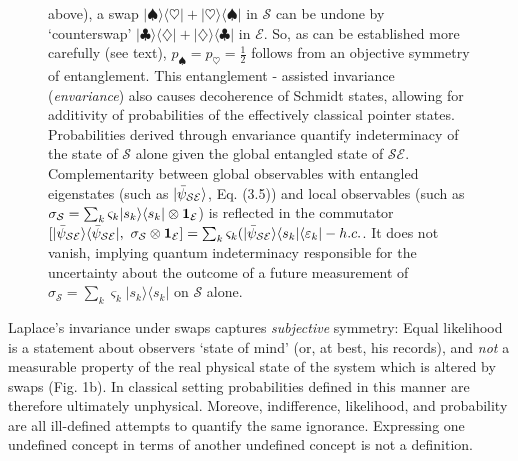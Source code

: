 \documentclass[aps,rmp,epsfig,11pt]{revtex4}
\newcommand{\bra}[1]    {\langle #1|}
\newcommand{\ket}[1]    {| #1 \rangle}
\newcommand{\cS}        {{\mathcal S}}
\newcommand{\cE}        {{\mathcal E}}
\newcommand{\+}         {\dagger}
\begin{document}
\begin{figure}[htb]
{above), a swap $\ket \spadesuit \bra \heartsuit + \ket \heartsuit \bra \spadesuit$ in $\cS$ can be undone by `counterswap' $\ket \clubsuit \bra \diamondsuit + \ket \diamondsuit \bra \clubsuit$ in $\cE$. So, 
as can be established more carefully (see text),  $p_\spadesuit = p_\heartsuit=\frac 1 2$ follows from 
an objective symmetry of entanglement. This entanglement - assisted invariance ({\it envariance}) 
also causes decoherence of Schmidt states, allowing for additivity of probabilities of the effectively classical pointer states. Probabilities derived through envariance quantify indeterminacy of the state of 
$\cS$ alone given the global entangled state of $\cS\cE$. Complementarity between 
global observables with entangled eigenstates (such as $\ket {\bar \psi_{\cal SE}}$, Eq. (3.5)) and 
local observables (such as $\sigma_{\cS} = \sum_k \varsigma_k |s_k \rangle \langle s_k|\otimes {\bf 1}_{\cE}$) is reflected in the commutator $[\ket {\bar \psi_{\cal SE}}\bra {\bar \psi_{\cal SE}}, ~\sigma_{\cS} \otimes {\bf 1}_{\cE}]=\sum_k \varsigma_k (\ket {\bar \psi_{\cal SE}}\bra {s_k } \bra {\varepsilon_k} - h.c.$. 
It does not vanish, implying quantum indeterminacy responsible for the uncertainty about the outcome 
of a future measurement of $\sigma_{\cS} = \sum_k \varsigma_k |s_k\rangle \langle s_k|$ on $\cS$ alone.}
\label{cards}
\end{figure}

Laplace's invariance under swaps captures {\it subjective} symmetry: Equal likelihood is a statement 
about observers `state of mind'  (or, at best, his records), and {\it not} a measurable property of the real 
physical state of the system which is altered by swaps (Fig. 1b). In classical setting probabilities defined 
in this manner are therefore ultimately unphysical. Moreove, indifference, likelihood, and probability are all ill-defined attempts to quantify the same ignorance. Expressing one undefined concept in terms of another undefined concept is not a definition.
\end{document}
